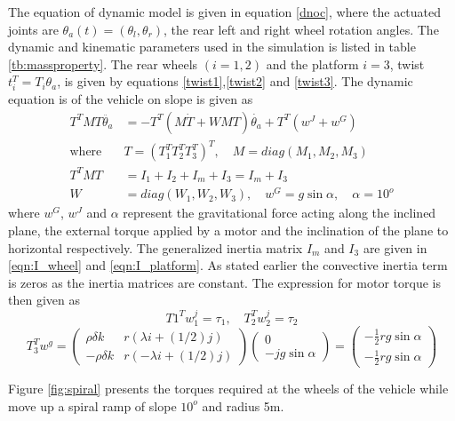 {The equation of  dynamic model  is given in equation \ref{dnoc}, where the actuated joints are  $\theta_a(t)=(\theta_l, \theta_r) $, the rear left and right wheel rotation angles. The dynamic  and kinematic  parameters used in the simulation is listed in table \ref{tb:massproperty}. The rear wheels $(i=1,2)$ and the platform $i=3$, twist $t_i^T=T_i\theta_a$, is given by equations \ref{twist1},\ref{twist2} and \ref{twist3}. The dynamic equation is of the vehicle on slope is given as 
\begin{equation}
\label{dnoc}
\begin{aligned}
T^TMT\ddot{\theta_a}&=-T^T(M\dot{T}+WMT)\dot{\theta_a}+T^T(w^J+w^G)\\
\text{where} \quad &
T=(T_1^T T_2^T T_3^T)^T, \quad M=diag(M_1, M_2, M_3)\\
T^TMT &=I_1+I_2+I_m+I_3= I_m+I_3\\
W&=diag(W_1,W_2,W_3),\quad w^G=g\sin\alpha, \quad \alpha=10^o
\end{aligned}
\end{equation}
where $w^G$, $ w^J$ and $\alpha$ represent the gravitational force acting along the inclined plane,  the external torque applied by a motor and the inclination of the plane to horizontal respectively. The generalized inertia matrix $I_m$ and $I_3$ are given in \ref{eqn:I_wheel} and \ref{eqn:I_platform}.
As stated earlier the convective inertia term is zeros as the inertia matrices are constant. The expression for motor torque  is then given as 
\begin{equation}
T1^Tw_1^j=\tau_1, \quad T_2^Tw_2^j=\tau_2
\end{equation}
\begin{equation}
 T_3^Tw^g=\begin{pmatrix}
\rho\delta k & r(\lambda i+(1/2)j) \\
 -\rho\delta k & r(-\lambda i+(1/2)j)
\end{pmatrix}
\begin{pmatrix}
0\\
-jg\sin\alpha
\end{pmatrix}=\begin{pmatrix}
-\frac{1}{2}rg\sin\alpha\\ -\frac{1}{2}rg\sin\alpha
\end{pmatrix}
\end{equation} 

Figure \ref{fig:spiral} presents the torques required at the wheels of the vehicle while move up a spiral ramp  of slope $10^o$ and radius 5m. 

}
